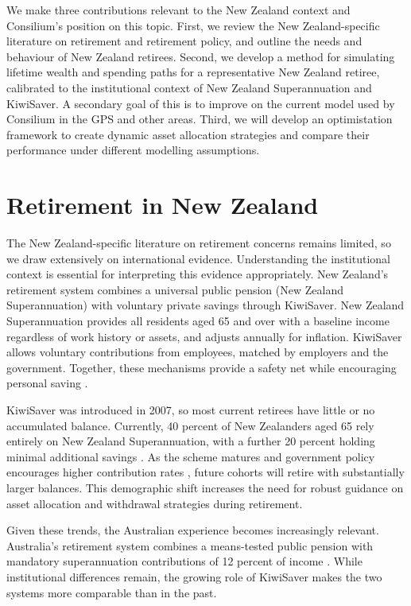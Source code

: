 \documentclass[11pt]{article}
\begin{document}
We make three contributions relevant to the New Zealand context and Consilium's position on this topic. First, we review the New Zealand-specific literature on retirement and retirement policy, and outline the needs and behaviour of New Zealand retirees. Second, we develop a method for simulating lifetime wealth and spending paths for a representative New Zealand retiree, calibrated to the institutional context of New Zealand Superannuation and KiwiSaver. A secondary goal of this is to improve on the current model used by Consilium in the GPS and other areas. Third, we will develop an optimistation framework to create dynamic asset allocation strategies and compare their performance under different modelling assumptions.

\section{Retirement in New Zealand}

The New Zealand-specific literature on retirement concerns remains limited, so we draw extensively on international evidence. Understanding the institutional context is essential for interpreting this evidence appropriately. New Zealand's retirement system combines a universal public pension (New Zealand Superannuation) with voluntary private savings through KiwiSaver. New Zealand Superannuation provides all residents aged 65 and over with a baseline income regardless of work history or assets, and adjusts annually for inflation. KiwiSaver allows voluntary contributions from employees, matched by employers and the government. Together, these mechanisms provide a safety net while encouraging personal saving \parencite{taao2021policyPaper03, msd2022retirementPolicies}.

KiwiSaver was introduced in 2007, so most current retirees have little or no accumulated balance. Currently, 40 percent of New Zealanders aged 65 rely entirely on New Zealand Superannuation, with a further 20 percent holding minimal additional savings \parencite{taao2022nzSuperReliance}. As the scheme matures and government policy encourages higher contribution rates \parencite{national2025kiwisaver}, future cohorts will retire with substantially larger balances. This demographic shift increases the need for robust guidance on asset allocation and withdrawal strategies during retirement.

Given these trends, the Australian experience becomes increasingly relevant. Australia's retirement system combines a means-tested public pension with mandatory superannuation contributions of 12 percent of income \parencite{atoSuperGuaranteePercentage, swoboda2014superannuationChronology}. While institutional differences remain, the growing role of KiwiSaver makes the two systems more comparable than in the past.
\end{document}
